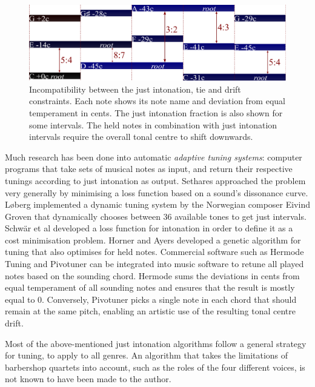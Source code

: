 \documentclass[a4paper]{article}
\begin{document}
\begin{figure}
	\centering
	\includegraphics[width=\textwidth]{Figures/ties_vs_ji.pdf}
	\caption{Incompatibility between the just intonation, tie and drift constraints. Each note shows its note name and deviation from equal temperament in cents. The just intonation fraction is also shown for some intervals. The held notes in combination with just intonation intervals require the overall tonal centre to shift downwards.}
	\label{fig:ties_vs_ji}
\end{figure}

Much research has been done into automatic \textit{adaptive tuning systems}: computer programs that take sets of musical notes as input, and return their respective tunings according to just intonation as output. \cite{sethares_adaptive_2005} Sethares \cite{sethares_adaptive_1994} approached the problem very generally by minimising a loss function based on a sound's dissonance curve. Løberg \cite{code_grovenmax_2002} implemented a dynamic tuning system by the Norwegian composer Eivind Groven that dynamically chooses between 36 available tones to get just intervals. Schwär et al \cite{schwar_differentiable_2021} developed a loss function for intonation in order to define it as a cost minimisation problem. Horner and Ayers \cite{horner_common_1996} developed a genetic algorithm for tuning that also optimises for held notes. Commercial software such as Hermode Tuning \cite{mohrlok_hermode_2003} and Pivotuner \cite{volkov_pivotuner_2022} can be integrated into music software to retune all played notes based on the sounding chord. Hermode sums the deviations in cents from equal temperament of all sounding notes and ensures that the result is mostly equal to 0. Conversely, Pivotuner picks a single note in each chord that should remain at the same pitch, enabling an artistic use of the resulting tonal centre drift.

Most of the above-mentioned just intonation algorithms follow a general strategy for tuning, to apply to all genres. An algorithm that takes the limitations of barbershop quartets into account, such as the roles of the four different voices, is not known to have been made to the author.
\end{document}
